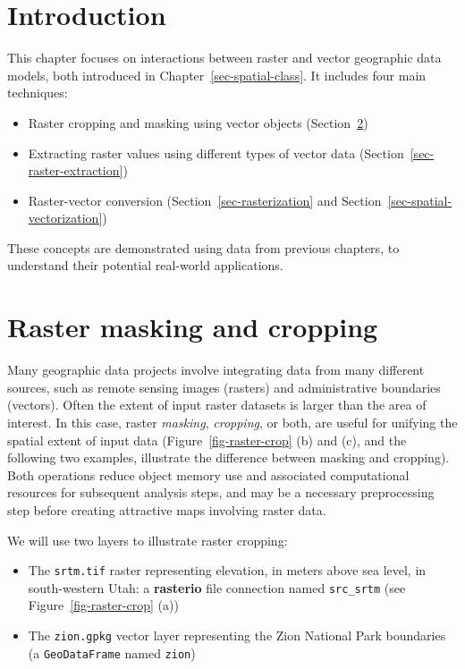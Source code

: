 \documentclass[
  letterpaper,
]{krantz}
\providecommand{\tightlist}{%
  \setlength{\itemsep}{0pt}\setlength{\parskip}{0pt}}\usepackage{longtable,booktabs,array}
\begin{document}
\section{Introduction}\label{introduction-4}

This chapter focuses on interactions between raster and vector
geographic data models, both introduced in
Chapter~\ref{sec-spatial-class}. It includes four main techniques:

\begin{itemize}
\tightlist
\item
  Raster cropping and masking using vector objects
  (Section~\ref{sec-raster-cropping})
\item
  Extracting raster values using different types of vector data
  (Section~\ref{sec-raster-extraction})
\item
  Raster-vector conversion (Section~\ref{sec-rasterization} and
  Section~\ref{sec-spatial-vectorization})
\end{itemize}

These concepts are demonstrated using data from previous chapters, to
understand their potential real-world applications.

\section{Raster masking and cropping}\label{sec-raster-cropping}

Many geographic data projects involve integrating data from many
different sources, such as remote sensing images (rasters) and
administrative boundaries (vectors). Often the extent of input raster
datasets is larger than the area of interest. In this case, raster
\emph{masking}, \emph{cropping}, or both, are useful for unifying the
spatial extent of input data (Figure~\ref{fig-raster-crop} (b) and (c),
and the following two examples, illustrate the difference between
masking and cropping). Both operations reduce object memory use and
associated computational resources for subsequent analysis steps, and
may be a necessary preprocessing step before creating attractive maps
involving raster data.

We will use two layers to illustrate raster cropping:

\begin{itemize}
\tightlist
\item
  The \texttt{srtm.tif} raster representing elevation, in meters above
  sea level, in south-western Utah: a \textbf{rasterio} file connection
  named \texttt{src\_srtm} (see Figure~\ref{fig-raster-crop} (a))
\item
  The \texttt{zion.gpkg} vector layer representing the Zion National
  Park boundaries (a \texttt{GeoDataFrame} named \texttt{zion})
\end{itemize}
\end{document}
